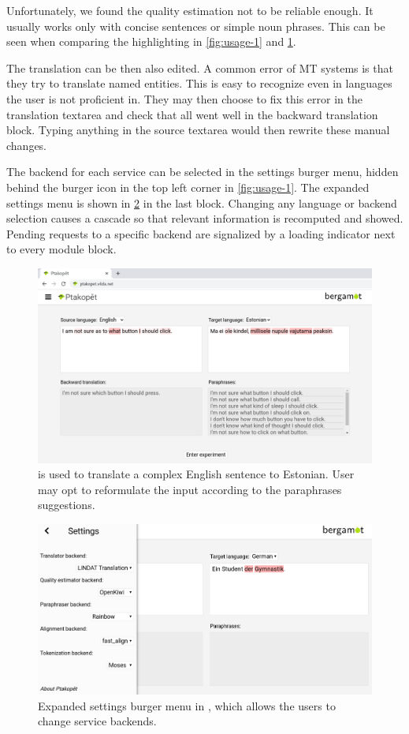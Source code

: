 Unfortunately, we found the quality estimation not to be reliable enough. It usually works only with concise sentences or simple noun phrases. This can be seen when comparing the highlighting in \cref{fig:usage-1} and \cref{fig:usage-2}.

The translation can be then also edited. A common error of MT systems is that they try to translate named entities. This is easy to recognize even in languages the user is not proficient in. They may then choose to fix this error in the translation textarea and check that all went well in the backward translation block. Typing anything in the source textarea would then rewrite these manual changes.

The backend for each service can be selected in the settings burger menu, hidden behind the burger icon in the top left corner in \cref{fig:usage-1}. The expanded settings menu is shown in \cref{fig:usage-settings} in the last block. Changing any language or backend selection causes a cascade so that relevant information is recomputed and showed. Pending requests to a specific backend are signalized by a loading indicator next to every module block.

\begin{figure}[ht]
  \centering
  \includegraphics[width=\textwidth]{img/usage/usage-2.png}
  \caption{\label{fig:usage-2} \ptakopet{} is used to translate a complex English sentence to Estonian. User may opt to reformulate the input according to the paraphrases suggestions.}
\end{figure}

\begin{figure}[ht]
  \centering
  \includegraphics[width=\textwidth]{img/usage/usage-settings.png}
  \caption{\label{fig:usage-settings} Expanded settings burger menu in \ptakopet{}, which allows the users to change service backends.}
\end{figure}

